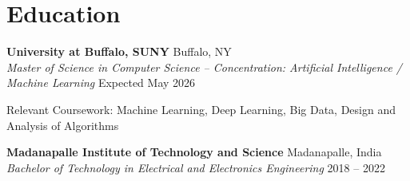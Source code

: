 \documentclass[letterpaper,10pt]{article}
\begin{document}
\section{Education}

\textbf{University at Buffalo, SUNY} \hfill Buffalo, NY \\
\textit{Master of Science in Computer Science -- Concentration: Artificial Intelligence / Machine Learning} \hfill Expected May 2026

\vspace{2pt}
Relevant Coursework: Machine Learning, Deep Learning, Big Data, Design and Analysis of Algorithms

\vspace{4pt}
\textbf{Madanapalle Institute of Technology and Science} \hfill Madanapalle, India \\
\textit{Bachelor of Technology in Electrical and Electronics Engineering} \hfill 2018 -- 2022
\end{document}
